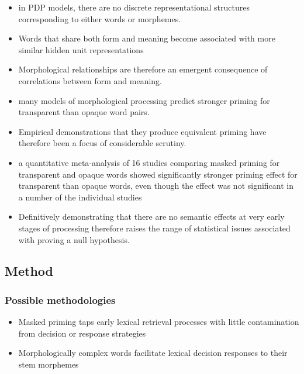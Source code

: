 \documentclass[]{article}
\begin{document}
\begin{itemize}
			\item in PDP models,  there are no discrete representational structures corresponding to either words or morphemes.
			\item Words that share both form and meaning become associated with more similar hidden unit representations
			\item Morphological relationships are therefore an emergent consequence of correlations between form and meaning.
			\item many models of morphological processing predict stronger priming for transparent than opaque word pairs.
			\item Empirical demonstrations that they produce equivalent priming have therefore been a focus of considerable scrutiny. 
			\item  a quantitative meta-analysis of 16 studies comparing masked priming for transparent and opaque words showed significantly stronger priming effect for transparent than opaque words, even though the effect was not significant in a number of the individual studies
			\item Definitively demonstrating that there are no semantic effects at very early stages of processing therefore raises the range of statistical issues associated with proving a null hypothesis.
		\end{itemize}
		\subsection{Method}	
			\subsubsection{Possible methodologies}
			\begin{itemize}
				\item Masked priming taps early lexical retrieval processes with little contamination from decision or response strategies
				\item Morphologically complex words facilitate lexical decision responses to their stem morphemes
			\end{itemize}
		
\end{document}
